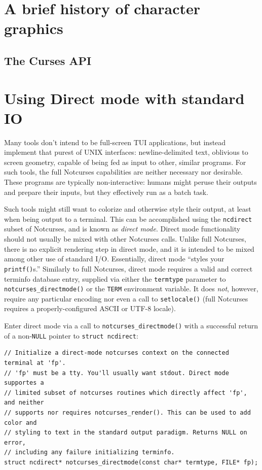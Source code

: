 \documentclass[letterpaper,10pt]{article}
\begin{document}
\newpage

\section{A brief history of character graphics}
\subsection{The Curses API}

\newpage

\section{Using Direct mode with standard I\/O}

Many tools don't intend to be full-screen TUI applications, but instead
implement that purest of UNIX interfaces: newline-delimited text, oblivious
to screen geometry, capable of being fed as input to other, similar programs.
For such tools, the full Notcurses capabilities are neither necessary nor
desirable. These programs are typically non-interactive: humans might peruse
their outputs and prepare their inputs, but they effectively run as a batch
task.

Such tools might still want to colorize and otherwise style their output, at
least when being output to a terminal. This can be accomplished using the
\texttt{ncdirect} subset of Notcurses, and is known as \textit{direct mode}. Direct
mode functionality should not usually be mixed with other Notcurses calls.
Unlike full Notcurses, there is no explicit rendering step in direct mode, and
it is intended to be mixed among other use of standard I/O. Essentially, direct
mode ``styles your \texttt{printf()}s.'' Similarly to full Notcurses, direct mode
requires a valid and correct terminfo database entry, supplied via either the
\texttt{termtype} parameter to \texttt{notcurses\_directmode()} or the \texttt{TERM} environment
variable. It does \textit{not}, however, require any particular encoding nor
even a call to \texttt{setlocale()} (full Notcurses requires a properly-configured
ASCII or UTF-8 locale).

Enter direct mode via a call to \texttt{notcurses\_directmode()} with a successful
return of a non-\texttt{NULL} pointer to \texttt{struct ncdirect}:

\begin{listing}[ht]
\begin{verbatim}
// Initialize a direct-mode notcurses context on the connected terminal at 'fp'.
// 'fp' must be a tty. You'll usually want stdout. Direct mode supportes a
// limited subset of notcurses routines which directly affect 'fp', and neither
// supports nor requires notcurses_render(). This can be used to add color and
// styling to text in the standard output paradigm. Returns NULL on error,
// including any failure initializing terminfo.
struct ncdirect* notcurses_directmode(const char* termtype, FILE* fp);
\end{verbatim}
\end{listing}
\end{document}
